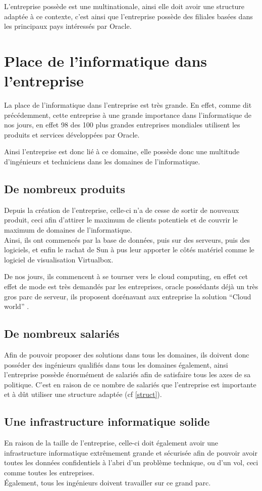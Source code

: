 \documentclass{article}
\begin{document}
	L'entreprise possède est une multinationale, ainsi elle doit avoir une structure adaptée à ce contexte, c'est ainsi que
	l'entreprise possède des filiales basées dans les principaux pays intéressés par Oracle.

	\section{Place de l'informatique dans l'entreprise}
	La place de l'informatique dans l'entreprise est très grande. En effet, comme dit précédemment, cette entreprise à une grande
	importance dans l'informatique de nos jours, en effet 
	98 des 100 plus grandes entreprises mondiales utilisent les produits et services développées par Oracle.

	Ainsi l'entreprise est donc lié à ce domaine, elle possède donc une multitude d'ingénieurs et techniciens dans les domaines de
	l'informatique.

	\subsection{De nombreux produits}
	Depuis la création de l'entreprise, celle-ci n'a de cesse de sortir de nouveaux produit, ceci afin d'attirer le maximum de
	clients potentiels et de couvrir le maximum de domaines de l'informatique.\\
	Ainsi, ils ont commencés par la base de données, puis sur des serveurs, puis des logiciels, et enfin le rachat de Sun à pus leur
	apporter le côtés matériel comme le logiciel de visualisation Virtualbox. 

	De nos jours, ils commencent à se tourner vers le cloud computing, en effet cet effet de mode est très demandés par les
	entreprises, oracle possédants déjà un très gros parc de serveur, ils proposent dorénavant aux entreprise la solution ``Cloud
	world'' .

	\subsection{De nombreux salariés}
	Afin de pouvoir proposer des solutions dans tous les domaines, ils doivent donc posséder des ingénieurs qualifiés dans tous les
	domaines également, ainsi l'entreprise possède énormément de salariés afin de satisfaire tous les axes de sa politique. C'est en
	raison de ce nombre de salariés que l'entreprise est importante et à dût utiliser une structure adaptée (cf \ref{struct}).

	\subsection{Une infrastructure informatique solide}
	En raison de la taille de l'entreprise, celle-ci doit également avoir une infrastructure informatique extrêmement grande et
	sécurisée afin de pouvoir avoir toutes les données confidentiels à l'abri d'un problème technique, ou d'un vol, ceci comme toutes
	les entreprises.\\
	Également, tous les ingénieurs doivent travailler sur ce grand parc.
\end{document}
